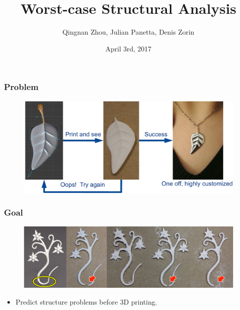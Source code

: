 \documentclass[serif,mathserif, 12pt]{beamer}
\author{Qingnan Zhou, Julian Panetta, Denis Zorin}
\title[\hspace{2em}\insertframenumber/\inserttotalframenumber]{Worst-case Structural Analysis}
\date{April 3rd, 2017}
\begin{document}
\maketitle

\begin{frame}
  \frametitle{Problem}
  \begin{figure}
    \centering
    \includegraphics[width=\textwidth]{img/printing_pipeline}
  \end{figure}
\end{frame}

\begin{frame}
  \frametitle{Goal}
  \begin{figure}
    \centering
    \includegraphics[width=\textwidth]{img/broken_flower}
  \end{figure}
  \pause
  \begin{itemize}
  \item Predict structure problems before 3D printing.
  \end{itemize}
\end{frame}
\end{document}
